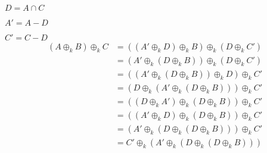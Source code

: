 \documentclass{article}
\begin{document}
$D = A \cap C$

$A' = A - D$

$C' = C - D$
\[\begin{split}
    (A \oplus_k B) \oplus_k C
    &= ((A' \oplus_k D) \oplus_k B) \oplus_k (D \oplus_k C') \\
    &= (A' \oplus_k (D \oplus_k B)) \oplus_k (D \oplus_k C') \\
    &= ((A' \oplus_k (D \oplus_k B)) \oplus_k D) \oplus_k C' \\
    &= (D \oplus_k (A' \oplus_k (D \oplus_k B))) \oplus_k C' \\
    &= ((D \oplus_k A') \oplus_k (D \oplus_k B)) \oplus_k C' \\
    &= ((A' \oplus_k D) \oplus_k (D \oplus_k B)) \oplus_k C' \\
    &= (A' \oplus_k (D \oplus_k (D \oplus_k B))) \oplus_k C' \\
    &= C' \oplus_k (A' \oplus_k (D \oplus_k (D \oplus_k B))) \\
\end{split}\]
\end{document}
